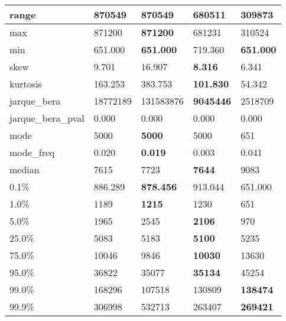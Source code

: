 \begin{table}[H]
\begin{tabular}{|l|m{10em}|m{10em}|m{10em}|m{10em}|}
\hline range & 870549 & \bfseries 870549 & 680511 & \cellcolor[rgb]{0.9, 0.54, 0.52} 309873 \\
\hline max & 871200 & \bfseries 871200 & 681231 & \cellcolor[rgb]{0.9, 0.54, 0.52} 310524 \\
\hline min & 651.000 & \bfseries 651.000 & \cellcolor[rgb]{0.9, 0.54, 0.52} 719.360 & \bfseries 651.000 \\
\hline skew & 9.701 & \cellcolor[rgb]{0.9, 0.54, 0.52} 16.907 & \bfseries 8.316 & 6.341 \\
\hline kurtosis & 163.253 & \cellcolor[rgb]{0.9, 0.54, 0.52} 383.753 & \bfseries 101.830 & 54.342 \\
\hline jarque\_bera & 18772189 & \cellcolor[rgb]{0.9, 0.54, 0.52} 131583876 & \bfseries 9045446 & 2518709 \\
\hline jarque\_bera\_pval & 0.000 & 0.000 & 0.000 & 0.000 \\
\hline mode & 5000 & \bfseries 5000 & 5000 & \cellcolor[rgb]{0.9, 0.54, 0.52} 651 \\
\hline mode\_freq & 0.020 & \bfseries 0.019 & 0.003 & \cellcolor[rgb]{0.9, 0.54, 0.52} 0.041 \\
\hline median & 7615 & 7723 & \bfseries 7644 & \cellcolor[rgb]{0.9, 0.54, 0.52} 9083 \\
\hline 0.1\% & 886.289 & \bfseries 878.456 & 913.044 & \cellcolor[rgb]{0.9, 0.54, 0.52} 651.000 \\
\hline 1.0\% & 1189 & \bfseries 1215 & 1230 & \cellcolor[rgb]{0.9, 0.54, 0.52} 651 \\
\hline 5.0\% & 1965 & 2545 & \bfseries 2106 & \cellcolor[rgb]{0.9, 0.54, 0.52} 970 \\
\hline 25.0\% & 5083 & 5183 & \bfseries 5100 & \cellcolor[rgb]{0.9, 0.54, 0.52} 5235 \\
\hline 75.0\% & 10046 & 9846 & \bfseries 10030 & \cellcolor[rgb]{0.9, 0.54, 0.52} 13630 \\
\hline 95.0\% & 36822 & 35077 & \bfseries 35134 & \cellcolor[rgb]{0.9, 0.54, 0.52} 45254 \\
\hline 99.0\% & 168296 & \cellcolor[rgb]{0.9, 0.54, 0.52} 107518 & 130809 & \bfseries 138474 \\
\hline 99.9\% & 306998 & \cellcolor[rgb]{0.9, 0.54, 0.52} 532713 & 263407 & \bfseries 269421 \\
\hline
\end{tabular}
\end{table}
